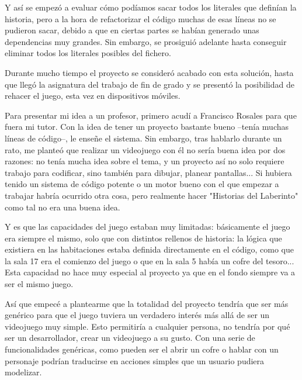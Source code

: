 Y así se empezó a evaluar cómo podíamos sacar todos los literales que definían la historia, pero a la hora de refactorizar el código muchas de esas líneas no se pudieron sacar, debido a que en ciertas partes se habían generado unas dependencias muy grandes. Sin embargo, se prosiguió adelante hasta conseguir eliminar todos los literales posibles del fichero.

Durante mucho tiempo el proyecto se consideró acabado con esta solución, hasta que llegó la asignatura del trabajo de fin de grado y se presentó la posibilidad de rehacer el juego, esta vez en dispositivos móviles.

Para presentar mi idea a un profesor, primero acudí a Francisco Rosales para que fuera mi tutor. Con la idea de tener un proyecto bastante bueno –tenía muchas líneas de código–, le enseñe el sistema. Sin embargo, tras hablarlo durante un rato, me planteó que realizar un videojuego con él no sería buena idea por dos razones: no tenía mucha idea sobre el tema, y un proyecto así no solo requiere trabajo para codificar, sino también para dibujar, planear pantallas... Si hubiera tenido un sistema de código potente o un motor bueno con el que empezar a trabajar habría ocurrido otra cosa, pero realmente hacer "Historias del Laberinto" como tal no era una buena idea.

Y es que las capacidades del juego estaban muy limitadas: básicamente el juego era siempre el mismo, solo que con distintos rellenos de historia: la lógica que existiera en las habitaciones estaba definida directamente en el código, como que la sala 17 era el comienzo del juego o que en la sala 5 había un cofre del tesoro...
Esta capacidad no hace muy especial al proyecto ya que en el fondo siempre va a ser el mismo juego.

Así que empecé a plantearme que la totalidad del proyecto tendría que ser más genérico para que el juego tuviera un verdadero interés más allá de ser un videojuego muy simple. Esto permitiría a cualquier persona, no tendría por qué ser un desarrollador, crear un videojuego a su gusto.
Con una serie de funcionalidades genéricas, como pueden ser el abrir un cofre o hablar con un personaje podrían traducirse en acciones simples que un usuario pudiera modelizar.

